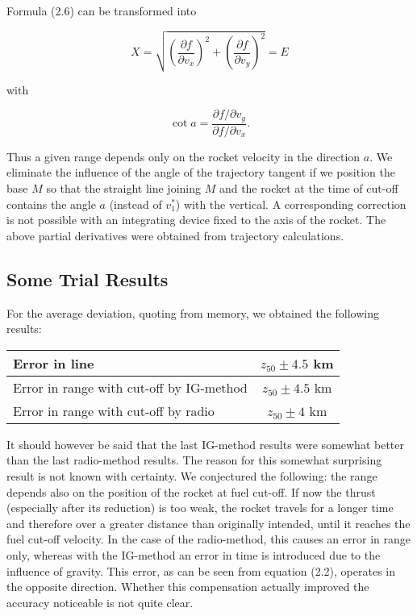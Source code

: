 \documentclass[12pt, a4paper]{article}
\begin{document}
\begin{enumerate}
Formula (2.6) can be transformed into

\begin{equation}
  X=\sqrt{\left(\frac{\partial f}{\partial v_{x}}\right)^{2}+\left(\frac{\partial f}{\partial v_{y}}\right)^{2}}=E
\end{equation}

with

\begin{equation}
  \cot a = \frac{\partial f/\partial v_{y}}{\partial f/\partial v_{x}}.
\end{equation}

Thus a given range depends only on the rocket velocity in the direction $a$. We eliminate the influence of the angle of the trajectory tangent if we position the base $M$ so that the straight line joining $M$ and the rocket at the time of cut-off contains the angle $a$ (instead of $v_{1}^{*}$) with the vertical. A corresponding correction is not possible with an integrating device fixed to the axis of the rocket. The above partial derivatives were obtained from trajectory calculations.
\end{enumerate}

\subsection{Some Trial Results}

For the average deviation, quoting from memory, we obtained the following
results:

\begin{center}
\begin{tabular}{|l|c|}
  \hline
  Error in line & $z_{50} \pm 4.5$ km \\\hline
  Error in range with cut-off by IG-method & $z_{50} \pm 4.5$ km \\\hline
  Error in range with cut-off by radio & $z_{50} \pm 4$ km \\\hline
\end{tabular}
\end{center}

It should however be said that the last IG-method results were somewhat better than the last radio-method results. The reason for this somewhat surprising result is not known with certainty. We conjectured the following: the range depends also on the position of the rocket at fuel cut-off. If now the thrust (especially after its reduction) is too weak, the rocket travels for a longer time and therefore over a greater distance than originally intended, until it reaches the fuel cut-off velocity. In the case of the radio-method, this causes an error in range only, whereas with the IG-method an error in time is introduced due to the influence of gravity. This error, as can be seen from equation (2.2), operates in the opposite direction. Whether this compensation actually improved the accuracy noticeable is not quite clear.
\end{document}
